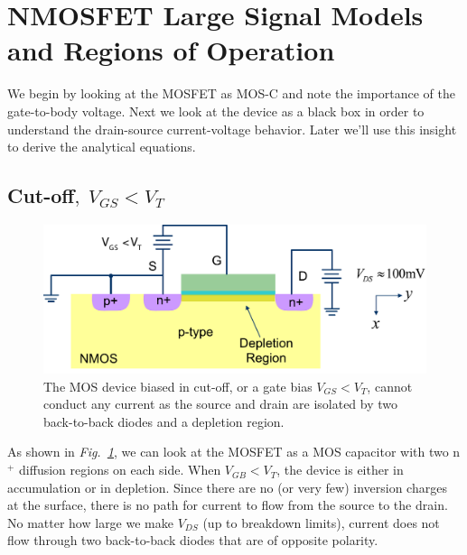 \section{NMOSFET Large Signal Models and Regions of Operation}
We begin by looking at the MOSFET as MOS-C and note the importance of the gate-to-body voltage.  Next we look at the device as a black box in order to understand the drain-source current-voltage behavior.  Later we'll use this insight to derive the analytical equations.
\subsection{Cut-off\texorpdfstring{$,\;V_{GS}<V_T$}{}}
\begin{figure}[tb]
\centering
\includegraphics[width=.75\columnwidth]{mos_cutoff}
\caption{The MOS device biased in cut-off, or a gate bias $V_{GS} < V_T$, cannot conduct any current as the source and drain are isolated by two back-to-back diodes and a depletion region.}
\label{fig:mos_cutoff}
\end{figure}
As shown in \emph{Fig.~\ref{fig:mos_cutoff}}, we can look at the MOSFET as a MOS capacitor with two n$^+$ diffusion regions on each side. When $V_{GB} < V_T$, the device is either in accumulation or in depletion. Since there are no (or very few) inversion charges at the surface, there is no path for current to flow from the source to the drain.  No matter how large we make $V_{DS}$ (up to breakdown limits), current does not flow through two back-to-back diodes that are of opposite polarity.
